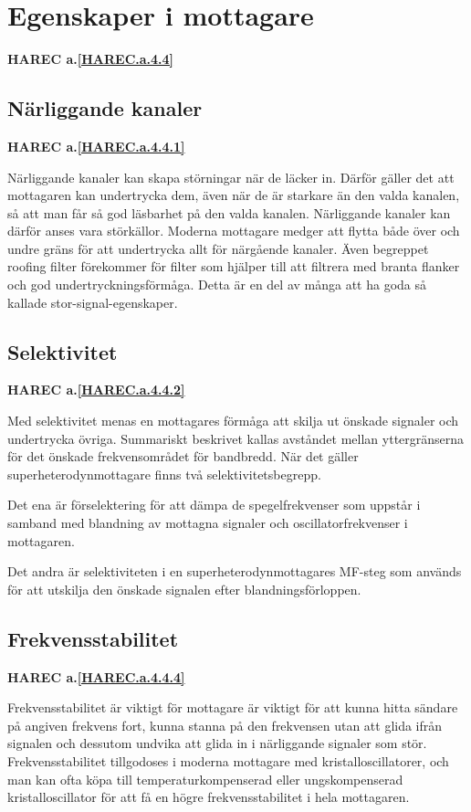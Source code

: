 \section{Egenskaper i mottagare}
\textbf{HAREC a.\ref{HAREC.a.4.4}\label{myHAREC.a.4.4}}

\subsection{Närliggande kanaler}
\textbf{HAREC a.\ref{HAREC.a.4.4.1}\label{myHAREC.a.4.4.1}}

Närliggande kanaler kan skapa störningar när de läcker in.
Därför gäller det att mottagaren kan undertrycka dem, även när de är starkare
än den valda kanalen, så att man får så god läsbarhet på den valda kanalen.
Närliggande kanaler kan därför anses vara störkällor.
Moderna mottagare medger att flytta både över och undre gräns för att
undertrycka allt för närgående kanaler.
Även begreppet roofing filter förekommer för filter som hjälper till att
filtrera med branta flanker och god undertryckningsförmåga.
Detta är en del av många att ha goda så kallade stor-signal-egenskaper.

\subsection{Selektivitet}
\textbf{HAREC a.\ref{HAREC.a.4.4.2}\label{myHAREC.a.4.4.2}}

Med selektivitet menas en mottagares förmåga att skilja ut önskade
signaler och undertrycka övriga. Summariskt beskrivet kallas avståndet
mellan yttergränserna för det önskade frekvensområdet för
bandbredd. När det gäller superheterodynmottagare finns två
selektivitetsbegrepp.

Det ena är förselektering för att dämpa de spegelfrekvenser som
uppstår i samband med blandning av mottagna signaler och
oscillatorfrekvenser i mottagaren.

Det andra är selektiviteten i en superheterodynmottagares MF-steg som används
för att utskilja den önskade signalen efter blandningsförloppen.

\subsection{Frekvensstabilitet}
\textbf{HAREC a.\ref{HAREC.a.4.4.4}\label{myHAREC.a.4.4.4}}

Frekvensstabilitet är viktigt för mottagare är viktigt för att kunna
hitta sändare på angiven frekvens fort, kunna stanna på den frekvensen utan
att glida ifrån signalen och dessutom undvika att glida in i närliggande
signaler som stör.
Frekvensstabilitet tillgodoses i moderna mottagare med kristalloscillatorer,
och man kan ofta köpa till temperaturkompenserad eller ungskompenserad
kristalloscillator för att få en högre frekvensstabilitet i hela mottagaren.

